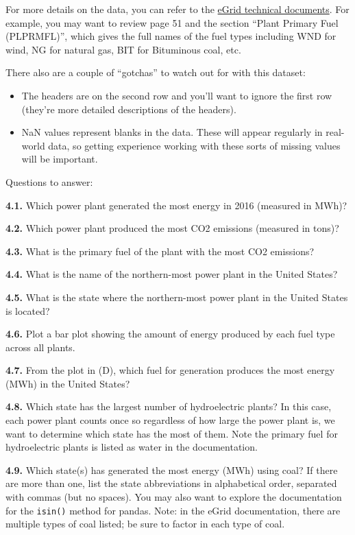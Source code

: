 \documentclass[
  letterpaper,
  DIV=11,
  numbers=noendperiod]{scrartcl}
\providecommand{\tightlist}{%
  \setlength{\itemsep}{0pt}\setlength{\parskip}{0pt}}\usepackage{longtable,booktabs,array}
\begin{document}
For more details on the data, you can refer to the
\href{https://www.epa.gov/sites/default/files/2020-01/documents/egrid2018_technical_support_document.pdf}{eGrid
technical documents}. For example, you may want to review page 51 and
the section ``Plant Primary Fuel (PLPRMFL)'', which gives the full names
of the fuel types including WND for wind, NG for natural gas, BIT for
Bituminous coal, etc.

There also are a couple of ``gotchas'' to watch out for with this
dataset:

\begin{itemize}
\tightlist
\item
  The headers are on the second row and you'll want to ignore the first
  row (they're more detailed descriptions of the headers).
\item
  NaN values represent blanks in the data. These will appear regularly
  in real-world data, so getting experience working with these sorts of
  missing values will be important.
\end{itemize}

Questions to answer:

\textbf{4.1.} Which power plant generated the most energy in 2016
(measured in MWh)?

\textbf{4.2.} Which power plant produced the most CO2 emissions
(measured in tons)?

\textbf{4.3.} What is the primary fuel of the plant with the most CO2
emissions?

\textbf{4.4.} What is the name of the northern-most power plant in the
United States?

\textbf{4.5.} What is the state where the northern-most power plant in
the United States is located?

\textbf{4.6.} Plot a bar plot showing the amount of energy produced by
each fuel type across all plants.

\textbf{4.7.} From the plot in (D), which fuel for generation produces
the most energy (MWh) in the United States?

\textbf{4.8.} Which state has the largest number of hydroelectric
plants? In this case, each power plant counts once so regardless of how
large the power plant is, we want to determine which state has the most
of them. Note the primary fuel for hydroelectric plants is listed as
water in the documentation.

\textbf{4.9.} Which state(s) has generated the most energy (MWh) using
coal? If there are more than one, list the state abbreviations in
alphabetical order, separated with commas (but no spaces). You may also
want to explore the documentation for the \texttt{isin()} method for
pandas. Note: in the eGrid documentation, there are multiple types of
coal listed; be sure to factor in each type of coal.
\end{document}
